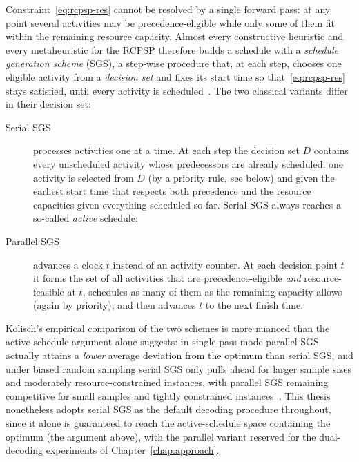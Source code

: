 Constraint~\eqref{eq:rcpsp-res} cannot be resolved by a single forward pass: at
any point several activities may be precedence-eligible while only some of them
fit within the remaining resource capacity. Almost every constructive heuristic
and every metaheuristic for the RCPSP therefore builds a schedule with a
\emph{schedule generation scheme} (SGS), a step-wise procedure that, at each
step, chooses one eligible activity from a \emph{decision set} and fixes its
start time so that~\eqref{eq:rcpsp-res} stays satisfied, until every activity is
scheduled~\cite{kolisch1996sgs}. The two classical variants differ in their
decision set:
\begin{description}
  \item[Serial SGS] processes activities one at a time. At each step the decision
        set $D$ contains every unscheduled activity whose predecessors are
        already scheduled; one activity is selected from $D$ (by a priority
        rule, see below) and given the earliest start time that respects both
        precedence and the resource capacities given everything scheduled so
        far. Serial SGS always reaches a so-called \emph{active} schedule:
  \item[Parallel SGS] advances a clock $t$ instead of an activity counter. At
        each decision point $t$ it forms the set of all activities that are
        precedence-eligible \emph{and} resource-feasible at $t$, schedules as
        many of them as the remaining capacity allows (again by priority), and
        then advances $t$ to the next finish time.
\end{description}
Kolisch's empirical comparison of the two schemes is more nuanced than the
active-schedule argument alone suggests: in single-pass mode parallel SGS
actually attains a \emph{lower} average deviation from the optimum than
serial SGS, and under biased random sampling serial SGS only pulls ahead for
larger sample sizes and moderately resource-constrained instances, with
parallel SGS remaining competitive for small samples and tightly constrained
instances~\cite{kolisch1996sgs}. This thesis nonetheless adopts serial SGS as
the default decoding procedure throughout, since it alone is guaranteed to
reach the active-schedule space containing the optimum (the argument above),
with the parallel variant reserved for the dual-decoding experiments of
Chapter~\ref{chap:approach}. 

